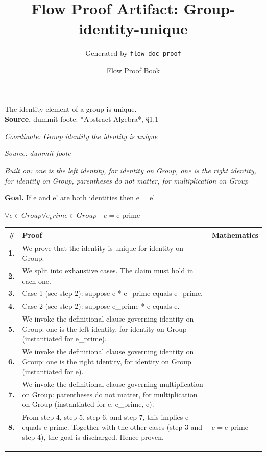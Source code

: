\documentclass[11pt]{article}
\title{Flow Proof Artifact: Group-identity-unique}
\author{Generated by \texttt{flow doc proof}}
\date{Flow Proof Book}
\theoremstyle{definition}
\begin{document}
\maketitle
The identity element of a group is unique.\\[0.5em]
\textbf{Source.} dummit-foote: *Abstract Algebra*, §1.1\\[0.5em]
\bigskip
{}\par
\smallskip\noindent\textit{Coordinate: Group \cdot identity \cdot the identity is unique}\par
\smallskip\noindent\textit{Source: dummit-foote}\par
\smallskip\noindent\textit{Built on: one is the left identity, for identity on Group, one is the right identity, for identity on Group, parentheses do not matter, for multiplication on Group}\par
\medskip
\noindent\textbf{Goal.} If e and e' are both identities then e = e'\par
\noindent$\displaystyle \forall e \in Group \forall e_prime \in Group\quad e = \text{e prime}$\par
\medskip
\noindent
\begin{tabular}{@{} >{\raggedright\arraybackslash}p{} >{\raggedright\arraybackslash}p{} >{\raggedleft\arraybackslash}p{} @{}}
\textbf{\#} & \textbf{Proof} & \textbf{Mathematics} \\
\midrule
\textbf{1.} & We prove that the identity is unique for identity on Group. & \\[0.45em]
\textbf{2.} & We split into exhaustive cases. The claim must hold in each one. & \\[0.45em]
\textbf{3.} & Case 1 (see step 2): suppose e * e\_prime  equals  e\_prime. & \\[0.45em]
\textbf{4.} & Case 2 (see step 2): suppose e\_prime * e  equals  e. & \\[0.45em]
\textbf{5.} & We invoke the definitional clause governing identity on Group: one is the left identity, for identity on Group (instantiated for e\_prime). & \\[0.45em]
\textbf{6.} & We invoke the definitional clause governing identity on Group: one is the right identity, for identity on Group (instantiated for e). & \\[0.45em]
\textbf{7.} & We invoke the definitional clause governing multiplication on Group: parentheses do not matter, for multiplication on Group (instantiated for e, e\_prime, e). & \\[0.45em]
\textbf{8.} & From step 4, step 5, step 6, and step 7, this implies e equals e prime. Together with the other cases (step 3 and step 4), the goal is discharged. Hence proven. & $\displaystyle e = \text{e prime}$ \\[0.45em]
\bottomrule
\end{tabular}
\label{thm:Group-identity-the_identity_is_unique}
\par\medskip\hrule
\end{document}
